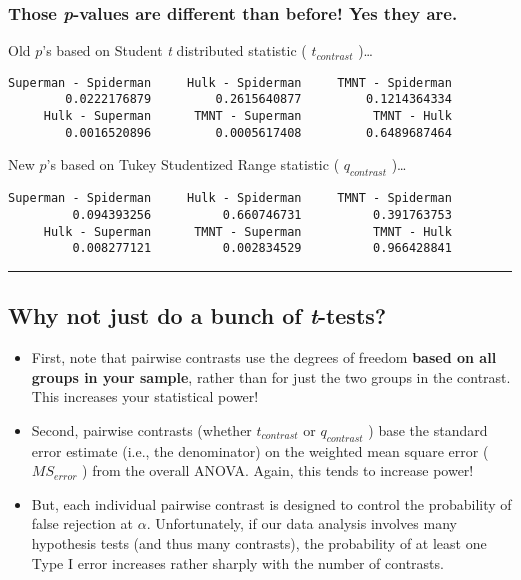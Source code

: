 \documentclass[]{article}
\begin{document}
\hypertarget{those-p-values-are-different-than-before-yes-they-are.}{%
\subsubsection{\texorpdfstring{Those \emph{p}-values are different than
before! Yes they
are.}{Those p-values are different than before! Yes they are.}}\label{those-p-values-are-different-than-before-yes-they-are.}}

Old \(p\)'s based on Student \emph{t} distributed statistic (
\(t_{contrast}\) )\ldots{}

\begin{verbatim}
Superman - Spiderman     Hulk - Spiderman     TMNT - Spiderman 
        0.0222176879         0.2615640877         0.1214364334 
     Hulk - Superman      TMNT - Superman          TMNT - Hulk 
        0.0016520896         0.0005617408         0.6489687464 
\end{verbatim}

New \(p\)'s based on Tukey Studentized Range statistic (
\(q_{contrast}\) )\ldots{}

\begin{verbatim}
Superman - Spiderman     Hulk - Spiderman     TMNT - Spiderman 
         0.094393256          0.660746731          0.391763753 
     Hulk - Superman      TMNT - Superman          TMNT - Hulk 
         0.008277121          0.002834529          0.966428841 
\end{verbatim}

\begin{center}\rule{0.5\linewidth}{\linethickness}\end{center}

\hypertarget{why-not-just-do-a-bunch-of-t-tests}{%
\subsection{\texorpdfstring{Why not just do a bunch of
\emph{t}-tests?}{Why not just do a bunch of t-tests?}}\label{why-not-just-do-a-bunch-of-t-tests}}

\begin{itemize}
\item
  First, note that pairwise contrasts use the degrees of freedom
  \textbf{based on all groups in your sample}, rather than for just the
  two groups in the contrast. This increases your statistical power!
\item
  Second, pairwise contrasts (whether \(t_{contrast}\) or
  \(q_{contrast}\) ) base the standard error estimate (i.e., the
  denominator) on the weighted mean square error ( \(MS_{error}\) ) from
  the overall ANOVA. Again, this tends to increase power!
\item
  But, each individual pairwise contrast is designed to control the
  probability of false rejection at \(\alpha\). Unfortunately, if our
  data analysis involves many hypothesis tests (and thus many
  contrasts), the probability of at least one Type I error increases
  rather sharply with the number of contrasts.
\end{itemize}
\end{document}
